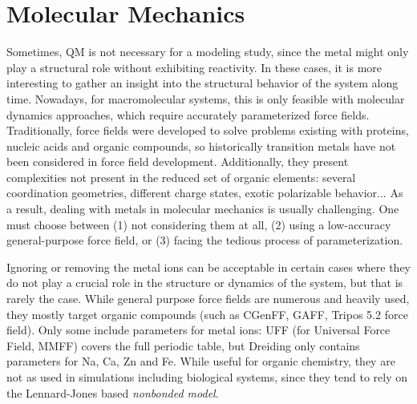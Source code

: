 \section{Molecular Mechanics}
Sometimes, QM is not necessary for a modeling study, since the metal might only play a structural role without exhibiting reactivity. In these cases, it is more interesting to gather an insight into the structural behavior of the system along time. Nowadays, for macromolecular systems, this is only feasible with molecular dynamics approaches, which require accurately parameterized force fields. Traditionally, force fields were developed to solve problems existing with proteins, nucleic acids and organic compounds,\cite{lifson1968consistent,allinger1973,momany1975energy} so historically transition metals have not been considered in force field development. Additionally, they present complexities not present in the reduced set of organic elements: several coordination geometries, different charge states, exotic polarizable behavior... As a result, dealing with metals in molecular mechanics is usually challenging. One must choose between (1) not considering them at all, (2) using a low-accuracy general-purpose force field, or (3) facing the tedious process of parameterization.

Ignoring or removing the metal ions can be acceptable in certain cases where they do not play a crucial role in the structure or dynamics of the system, but that is rarely the case. While general purpose force fields are numerous and heavily used, they mostly target organic compounds (such as CGenFF,\cite{Vanommeslaeghe2009} GAFF,\cite{Wang2004} Tripos 5.2 force field\cite{clark1989}). Only some include parameters for metal ions: UFF (for Universal Force Field,\cite{Rappe1992} MMFF\cite{halgren1996}) covers the full periodic table, but Dreiding\cite{Mayo1990} only contains parameters for Na, Ca, Zn and Fe. While useful for organic chemistry, they are not as used in simulations including biological systems, since they tend to rely on the Lennard-Jones based \textit{nonbonded model}.


